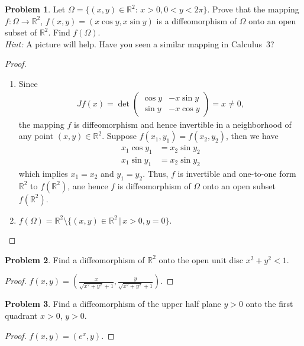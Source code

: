 \documentclass[11pt]{article}
\theoremstyle{definition}
\newtheorem{problem}{Problem}
\theoremstyle{definition}
\begin{document}
\begin{problem}
Let $\Omega=\{(x,y)\in\mathbb{R}^2:\, x>0, 0<y<2\pi\}$.
Prove that the mapping $f:\Omega\to\mathbb{R}^2$,
$f(x,y)=(x\cos y,x\sin y)$ is a diffeomorphism of $\Omega$
onto an open subset of $\mathbb{R}^2$. Find $f(\Omega)$.\\
{\em Hint:} A picture will help. Have you seen a similar mapping in Calculus~3?
\end{problem}
\begin{proof}
~\begin{enumerate}[label=(\alph*)]
    \item Since
    \begin{align*}
        Jf(x) = \det \begin{pmatrix}
            \cos y & -x \sin y \\
            \sin y & -x \cos y
        \end{pmatrix} = x \neq 0,
    \end{align*}
    the mapping $f$ is diffeomorphism and hence invertible in a neighborhood of any point $(x,y) \in \mathbb{R}^2$. Suppose $f(x_1, y_1) = f(x_2, y_2)$, then we have
    \begin{align*}
        x_1 \cos y_1 & = x_2 \sin y_2 \\
        x_1 \sin y_1 & = x_2 \sin y_2
    \end{align*}
    which implies $x_1 = x_2$ and $y_1 = y_2$. Thus, $f$ is invertible and one-to-one form $\mathbb{R}^2$ to $f(\mathbb{R}^2)$, ane hence $f$ is diffeomorphism of $\Omega$ onto an open subset $f(\mathbb{R}^2)$.
    
    \item $f(\Omega) = \mathbb{R}^2\setminus \{(x, y) \in \mathbb{R}^2 \,|\, x > 0, y = 0\}$.
\end{enumerate}

\end{proof}

\medskip

\begin{problem}
Find a diffeomorphism of $\mathbb{R}^2$ onto the open unit disc $x^2 + y^2 < 1$.
\end{problem}
\begin{proof}
$f(x,y) = \left(\frac{x}{\sqrt{x^2+y^2}+1}, \frac{y}{\sqrt{x^2+y^2}+1}\right)$.
\end{proof}

\medskip

\begin{problem}
Find a diffeomorphism of the upper half plane $y>0$ onto the first quadrant $x>0$, $y>0$.
\end{problem}
\begin{proof}
$f(x,y) = \left(e^x, y\right)$.
\end{proof}
\end{document}
